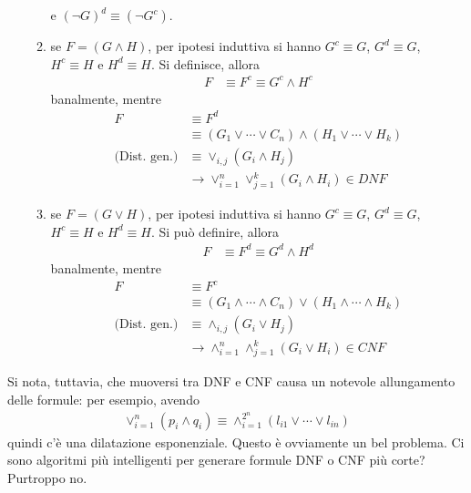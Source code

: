 \begin{itemize}
\begin{enumerate}
                                e $(\neg G)^d \equiv (\neg G^c)$. 
                        \item se $F = (G \land H)$, per ipotesi induttiva si hanno
                                $G^c \equiv G$, $G^d \equiv G$, $H^c \equiv H$ e 
                                $H^d \equiv H$. 
                                Si definisce, allora 
                                \begin{align*}
                                        F &\equiv F^c  \equiv G^c \land H^c
                                \end{align*}
                                banalmente, mentre 
                                \begin{align*}
                                        F &\equiv F^d \\
                                          &\equiv (G_1 \lor \cdots \lor C_n) \land (H_1 \lor \cdots \lor H_k) \\
                                        \text{(Dist. gen.)} &\equiv \lor_{i,j}(G_i \land H_j) \\
                                                            &\rightarrow \lor_{i=1}^n \lor_{j=1}^k (G_i \land H_i) \in DNF
                                \end{align*}
                        \item se $F = (G \lor H)$, per ipotesi induttiva si hanno
                                $G^c \equiv G$, $G^d \equiv G$, $H^c \equiv H$ e 
                                $H^d \equiv H$.                 
                                Si può definire, allora 
                                \begin{align*}
                                        F &\equiv F^d  \equiv G^d \land H^d
                                \end{align*}
                                banalmente, mentre 
                                \begin{align*}
                                        F &\equiv F^c \\
                                          &\equiv (G_1 \land \cdots \land C_n) \lor (H_1 \land \cdots \land H_k) \\
                                        \text{(Dist. gen.)} &\equiv \land_{i,j}(G_i \lor H_j) \\
                                                            &\rightarrow \land_{i=1}^n \land_{j=1}^k (G_i \lor H_i) \in CNF
                                \end{align*}                
                \end{enumerate}
\end{itemize}

Si nota, tuttavia, che muoversi tra DNF e CNF causa un notevole allungamento 
delle formule: per esempio, avendo 
\begin{align*}
        \lor_{i = 1}^{n} (p_i \land q_i) \equiv \land_{i = 1}^{2^n}(l_{i1} \lor \cdots \lor l_{in})
\end{align*}
quindi c'è una dilatazione esponenziale. Questo è ovviamente un bel problema. 
Ci sono algoritmi più intelligenti per generare formule DNF o CNF più corte? 
Purtroppo no. 
